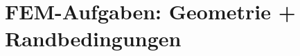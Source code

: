 \documentclass[a4paper,11pt]{article}
\newcommand{\pinsupport}[1]{%
  \draw[thick] (#1) -- ++(0,-0.35);
  \draw[thick,fill=white] ($(#1)+(0,-0.35)$) ++(-0.30,0) -- ++(0.60,0) -- ++(-0.30,0.25) -- cycle;
  \draw[thick] ($(#1)+(0,-0.45)$) ++(-0.45,0) -- ++(0.90,0);
}
\newcommand{\rollersupport}[1]{%
  \draw[thick] (#1) -- ++(0,-0.35);
  \draw[thick,fill=white] ($(#1)+(0,-0.35)$) ++(-0.30,0) -- ++(0.60,0) -- ++(-0.30,0.25) -- cycle;
  \draw[thick] ($(#1)+(0,-0.42)$) ++(-0.18,0) circle (0.07);
  \draw[thick] ($(#1)+(0,-0.42)$) ++( 0.18,0) circle (0.07);
  \draw[thick] ($(#1)+(0,-0.52)$) ++(-0.45,0) -- ++(0.90,0);
}
\begin{document}
\section*{FEM-Aufgaben: Geometrie + Randbedingungen}

\usepackage{tikz}
\usetikzlibrary{arrows.meta,calc}

\newcommand{\pinsupport}[1]{%
  \draw[thick] (#1) -- ++(0,-0.35);
  \draw[thick,fill=white] ($(#1)+(0,-0.35)$) ++(-0.30,0) -- ++(0.60,0) -- ++(-0.30,0.25) -- cycle;
  \draw[thick] ($(#1)+(0,-0.45)$) ++(-0.45,0) -- ++(0.90,0);
}
\newcommand{\rollersupport}[1]{%
  \draw[thick] (#1) -- ++(0,-0.35);
  \draw[thick,fill=white] ($(#1)+(0,-0.35)$) ++(-0.30,0) -- ++(0.60,0) -- ++(-0.30,0.25) -- cycle;
  \draw[thick] ($(#1)+(0,-0.42)$) ++(-0.18,0) circle (0.07);
  \draw[thick] ($(#1)+(0,-0.42)$) ++( 0.18,0) circle (0.07);
  \draw[thick] ($(#1)+(0,-0.52)$) ++(-0.45,0) -- ++(0.90,0);
}
\end{document}
